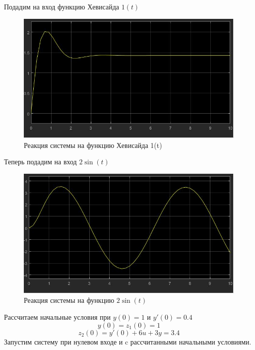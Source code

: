 \documentclass[a4paper, 12pt]{article}
\begin{document}
        Подадим на вход функцию Хевисайда $1(t)$
        \begin{figure}[H]
            \centering
            \includegraphics[scale=0.4]{hev1.jpg}
            \captionsetup{skip=0pt}
            \caption{Реакция системы на функцию Хевисайда 1(t)}
            \label{fig:2imspdf}
        \end{figure}
        Теперь подадим на вход $2\sin(t)$
        \begin{figure}[H]
            \centering
            \includegraphics[scale=0.4]{2sin(t).jpg}
            \captionsetup{skip=0pt}
            \caption{Реакция системы на функцию $2\sin(t)$}
            \label{fig:3imspdf}
        \end{figure}
        \noindent Рассчитаем начальные условия при $y(0) = 1\text{ и } y'(0) = 0.4$\\
        $$y(0) = z_1(0) = 1$$
        $$z_2(0) = y'(0) + 6u + 3y = 3.4$$
        Запустим систему при нулевом входе и c рассчитанными начальными условиями.
\end{document}
